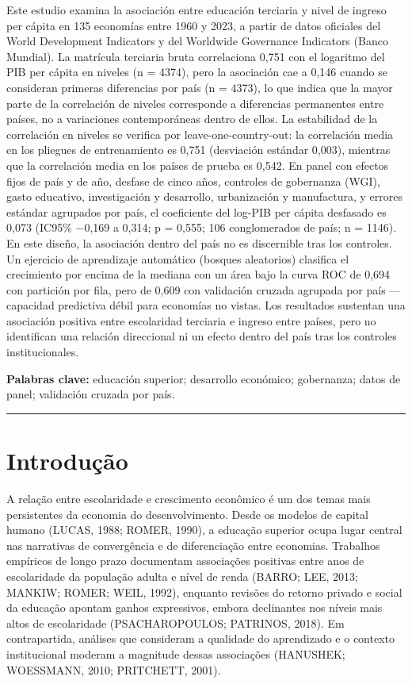 \documentclass[12pt,a4paper]{article}
\begin{document}
Este estudio examina la asociación entre educación terciaria y nivel de ingreso per cápita en 135 economías entre 1960 y 2023, a partir de datos oficiales del World Development Indicators y del Worldwide Governance Indicators (Banco Mundial). La matrícula terciaria bruta correlaciona 0,751 con el logaritmo del PIB per cápita en niveles (n = 4374), pero la asociación cae a 0,146 cuando se consideran primeras diferencias por país (n = 4373), lo que indica que la mayor parte de la correlación de niveles corresponde a diferencias permanentes entre países, no a variaciones contemporáneas dentro de ellos. La estabilidad de la correlación en niveles se verifica por leave-one-country-out: la correlación media en los pliegues de entrenamiento es 0,751 (desviación estándar 0,003), mientras que la correlación media en los países de prueba es 0,542. En panel con efectos fijos de país y de año, desfase de cinco años, controles de gobernanza (WGI), gasto educativo, investigación y desarrollo, urbanización y manufactura, y errores estándar agrupados por país, el coeficiente del log-PIB per cápita desfasado es 0,073 (IC95\% $-$0,169 a 0,314; p = 0,555; 106 conglomerados de país; n = 1146). En este diseño, la asociación dentro del país no es discernible tras los controles. Un ejercicio de aprendizaje automático (bosques aleatorios) clasifica el crecimiento por encima de la mediana con un área bajo la curva ROC de 0,694 con partición por fila, pero de 0,609 con validación cruzada agrupada por país --- capacidad predictiva débil para economías no vistas. Los resultados sustentan una asociación positiva entre escolaridad terciaria e ingreso entre países, pero no identifican una relación direccional ni un efecto dentro del país tras los controles institucionales.

\noindent\textbf{Palabras clave:} educación superior; desarrollo económico; gobernanza; datos de panel; validación cruzada por país.

\vspace{0.6cm}
\hrule
\vspace{0.6cm}

\section{Introdução}

A relação entre escolaridade e crescimento econômico é um dos temas mais persistentes da economia do desenvolvimento. Desde os modelos de capital humano (LUCAS, 1988; ROMER, 1990), a educação superior ocupa lugar central nas narrativas de convergência e de diferenciação entre economias. Trabalhos empíricos de longo prazo documentam associações positivas entre anos de escolaridade da população adulta e nível de renda (BARRO; LEE, 2013; MANKIW; ROMER; WEIL, 1992), enquanto revisões do retorno privado e social da educação apontam ganhos expressivos, embora declinantes nos níveis mais altos de escolaridade (PSACHAROPOULOS; PATRINOS, 2018). Em contrapartida, análises que consideram a qualidade do aprendizado e o contexto institucional moderam a magnitude dessas associações (HANUSHEK; WOESSMANN, 2010; PRITCHETT, 2001).
\end{document}

